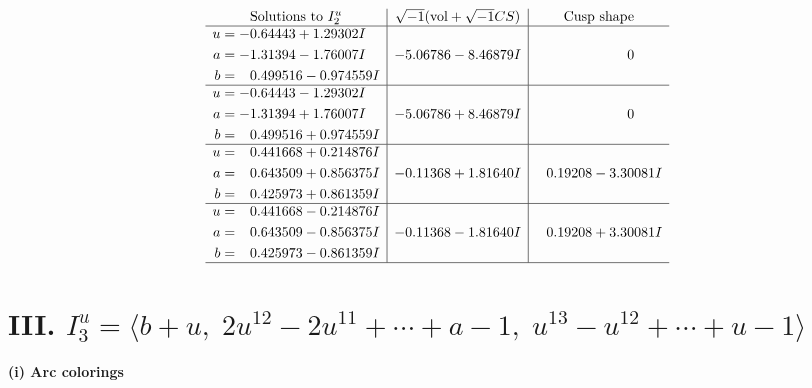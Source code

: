\documentclass[1p]{elsarticle_modified}
\theoremstyle{definition}
\newcommand{\I}{\sqrt{-1}}
\begin{document}
$$\begin{array}{c|c|c}
\text{Solutions to }I^u_{2}& \I (\text{vol} + \sqrt{-1}CS) & \text{Cusp shape}\\
 \hline 
\begin{aligned}
u &= -0.64443 + 1.29302 I \\
a &= -1.31394 - 1.76007 I \\
b &= \phantom{-}0.499516 - 0.974559 I\end{aligned}
 & -5.06786 - 8.46879 I & \phantom{-0.000000 } 0 \\ \hline\begin{aligned}
u &= -0.64443 - 1.29302 I \\
a &= -1.31394 + 1.76007 I \\
b &= \phantom{-}0.499516 + 0.974559 I\end{aligned}
 & -5.06786 + 8.46879 I & \phantom{-0.000000 } 0 \\ \hline\begin{aligned}
u &= \phantom{-}0.441668 + 0.214876 I \\
a &= \phantom{-}0.643509 + 0.856375 I \\
b &= \phantom{-}0.425973 + 0.861359 I\end{aligned}
 & -0.11368 + 1.81640 I & \phantom{-}0.19208 - 3.30081 I \\ \hline\begin{aligned}
u &= \phantom{-}0.441668 - 0.214876 I \\
a &= \phantom{-}0.643509 - 0.856375 I \\
b &= \phantom{-}0.425973 - 0.861359 I\end{aligned}
 & -0.11368 - 1.81640 I & \phantom{-}0.19208 + 3.30081 I\\
 \hline 
 \end{array}$$\newpage\newpage\renewcommand{\arraystretch}{1}
\centering \section*{III. $I^u_{3}= \langle b+u,\;2 u^{12}-2 u^{11}+\cdots+a-1,\;u^{13}- u^{12}+\cdots+u-1 \rangle$}
\flushleft \textbf{(i) Arc colorings}\\
\end{document}
